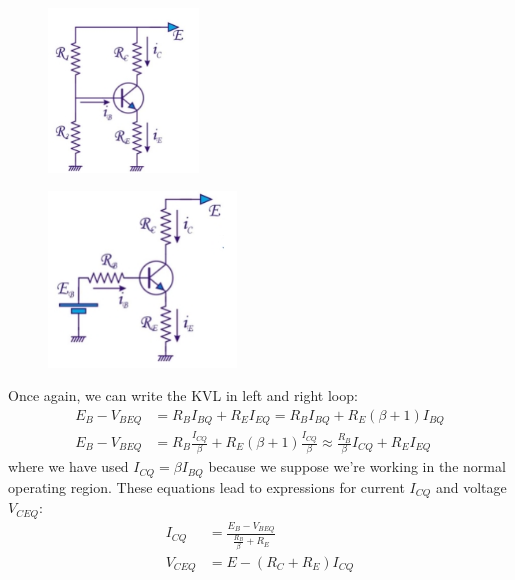 \begin{figure}[h!]
	\centering
	\begin{minipage}{.5\textwidth}
		\centering
		\includegraphics[width=4cm]{figures/ch02/general1a.jpg}
		\label{fig:general1a}
	\end{minipage}%
	\begin{minipage}{.5\textwidth}
		\centering
		\includegraphics[width=5cm]{figures/ch02/general1b.jpg}
		\label{fig:general1b}
	\end{minipage}
\end{figure}
Once again, we can write the KVL in left and right loop:
\begin{equation}
	\begin{split}
		E_B - V_{BEQ} &= R_B I_{BQ} + R_E I_{EQ} = R_B I_{BQ} + R_E (\beta + 1) I_{BQ} \\
		E_B - V_{BEQ} &= R_B \frac{I_{CQ}}{\beta} + R_E (\beta + 1) \frac{I_{CQ}}{\beta} \approx \frac{R_B}{\beta} I_{CQ} + R_E I_{EQ}
	\end{split}
\end{equation}
where we have used $I_{CQ} = \beta I_{BQ}$ because we suppose we're working in the normal operating region. These equations lead to expressions for current $I_{CQ}$ and voltage $V_{CEQ}$:
\begin{equation}
	\begin{split}
		I_{CQ} &= \frac{E_B - V_{BEQ}}{\frac{R_B}{\beta} + R_E}\\
		V_{CEQ} &= E - (R_C + R_E) I_{CQ}
	\end{split}
	\label{eq:four_resitors1}
\end{equation}
